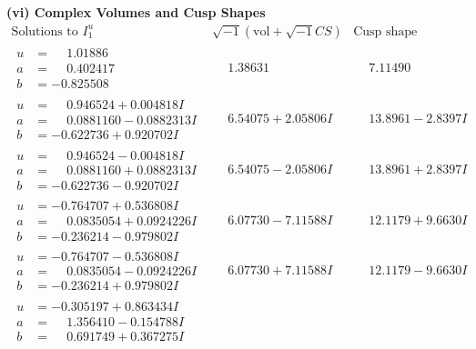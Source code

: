 \documentclass[1p]{elsarticle_modified}
\theoremstyle{definition}
\newcommand{\I}{\sqrt{-1}}
\begin{document}
\newpage\flushleft \textbf{(vi) Complex Volumes and Cusp Shapes}
$$\begin{array}{c|c|c}  
\text{Solutions to }I^u_{1}& \I (\text{vol} + \sqrt{-1}CS) & \text{Cusp shape}\\
 \hline 
\begin{aligned}
u &= \phantom{-}1.01886\phantom{ +0.000000I} \\
a &= \phantom{-}0.402417\phantom{ +0.000000I} \\
b &= -0.825508\phantom{ +0.000000I}\end{aligned}
 & \phantom{-}1.38631\phantom{ +0.000000I} & \phantom{-}7.11490\phantom{ +0.000000I} \\ \hline\begin{aligned}
u &= \phantom{-}0.946524 + 0.004818 I \\
a &= \phantom{-}0.0881160 - 0.0882313 I \\
b &= -0.622736 + 0.920702 I\end{aligned}
 & \phantom{-}6.54075 + 2.05806 I & \phantom{-}13.8961 - 2.8397 I \\ \hline\begin{aligned}
u &= \phantom{-}0.946524 - 0.004818 I \\
a &= \phantom{-}0.0881160 + 0.0882313 I \\
b &= -0.622736 - 0.920702 I\end{aligned}
 & \phantom{-}6.54075 - 2.05806 I & \phantom{-}13.8961 + 2.8397 I \\ \hline\begin{aligned}
u &= -0.764707 + 0.536808 I \\
a &= \phantom{-}0.0835054 + 0.0924226 I \\
b &= -0.236214 - 0.979802 I\end{aligned}
 & \phantom{-}6.07730 - 7.11588 I & \phantom{-}12.1179 + 9.6630 I \\ \hline\begin{aligned}
u &= -0.764707 - 0.536808 I \\
a &= \phantom{-}0.0835054 - 0.0924226 I \\
b &= -0.236214 + 0.979802 I\end{aligned}
 & \phantom{-}6.07730 + 7.11588 I & \phantom{-}12.1179 - 9.6630 I \\ \hline\begin{aligned}
u &= -0.305197 + 0.863434 I \\
a &= \phantom{-}1.356410 - 0.154788 I \\
b &= \phantom{-}0.691749 + 0.367275 I\end{aligned}

\end{array}$$
\end{document}
